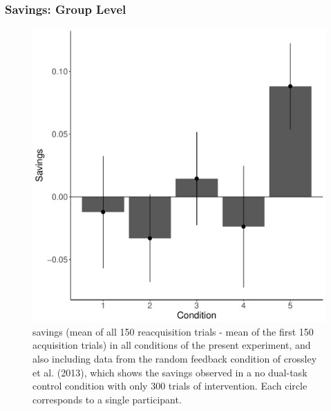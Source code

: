 \subsubsection*{Savings: Group Level}
\begin{figure}[t]
  \centering \includegraphics[width=1.0\textwidth]{../figures/fig_savings.pdf}
  \caption{ savings (mean of all 150 reacquisition trials - mean of the first
    150 acquisition trials) in all conditions of the present experiment, and also
    including data from the random feedback condition of crossley et al. (2013),
    which shows the savings observed in a no dual-task control condition with only
    300 trials of intervention. Each circle corresponds to a single participant. }
  \label{fig:savings}
\end{figure}

